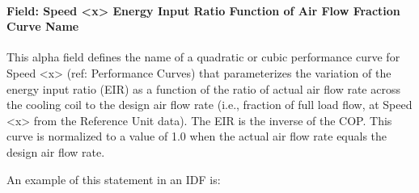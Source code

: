 \paragraph{Field: Speed \textless{}x\textgreater{} Energy Input Ratio Function of Air Flow Fraction Curve Name}\label{field-speed-x-energy-input-ratio-function-of-air-flow-fraction-curve-name}

This alpha field defines the name of a quadratic or cubic performance curve for Speed \textless{}x\textgreater{} (ref: Performance Curves) that parameterizes the variation of the energy input ratio (EIR) as a function of the ratio of actual air flow rate across the cooling coil to the design air flow rate (i.e., fraction of full load flow, at Speed \textless{}x\textgreater{} from the Reference Unit data). The EIR is the inverse of the COP. This curve is normalized to a value of 1.0 when the actual air flow rate equals the design air flow rate.

An example of this statement in an IDF is:

